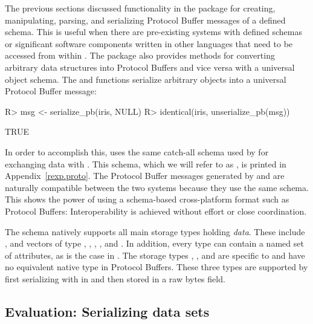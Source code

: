 \documentclass[article]{jss}
\begin{document}
The previous sections discussed functionality in the  package
for creating, manipulating, parsing, and serializing Protocol Buffer
messages of a defined schema.  This is useful when there are
pre-existing systems with defined schemas or significant software
components written in other languages that need to be accessed from
within .
The package also provides methods for converting arbitrary  data structures into Protocol
Buffers and vice versa with a universal  object schema. The  and 
functions serialize arbitrary  objects into a universal Protocol Buffer
message:
%
\begin{Schunk}
\begin{Sinput}
R> msg <- serialize_pb(iris, NULL)
R> identical(iris, unserialize_pb(msg))
\end{Sinput}
\begin{Soutput}
[1] TRUE
\end{Soutput}
\end{Schunk}
%
In order to accomplish this,  uses the same catch-all
 schema used by  for exchanging 
data with  \citep{rhipe}. This schema, which we will refer to as
, is printed in Appendix~\ref{rexp.proto}.  The
Protocol Buffer messages generated by  and 
are naturally compatible between the two systems because they use the
same schema. This shows the power of using a schema-based
cross-platform format such as Protocol Buffers: Interoperability is
achieved without effort or close coordination.

The  schema natively supports all main 
storage types holding \emph{data}.  These include ,
 and vectors of type , ,
, , and . In addition, every
type can contain a named set of attributes, as is the case in
. The storage types , , and
 are specific to  and have no equivalent
native type in Protocol Buffers.  These three types are supported by
first serializing with  in  and
then stored in a raw bytes field.


\subsection[Evaluation: Serializing R data sets]{Evaluation: Serializing  data sets}
\label{sec:compression}
\end{document}
